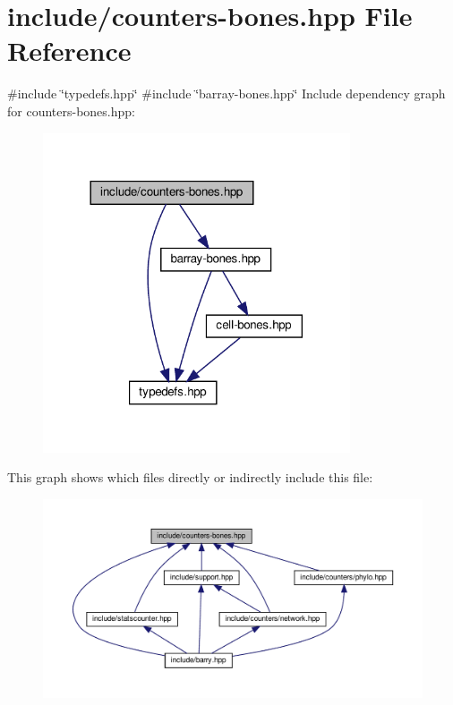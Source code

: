 \hypertarget{counters-bones_8hpp}{}\section{include/counters-\/bones.hpp File Reference}
\label{counters-bones_8hpp}
{\ttfamily \#include \char`\"{}typedefs.\+hpp\char`\"{}}\newline
{\ttfamily \#include \char`\"{}barray-\/bones.\+hpp\char`\"{}}\newline
Include dependency graph for counters-\/bones.hpp\+:\nopagebreak
\begin{figure}[H]
\begin{center}
\leavevmode
\includegraphics[width=257pt]{counters-bones_8hpp__incl}
\end{center}
\end{figure}
This graph shows which files directly or indirectly include this file\+:
\nopagebreak
\begin{figure}[H]
\begin{center}
\leavevmode
\includegraphics[width=350pt]{counters-bones_8hpp__dep__incl}
\end{center}
\end{figure}
